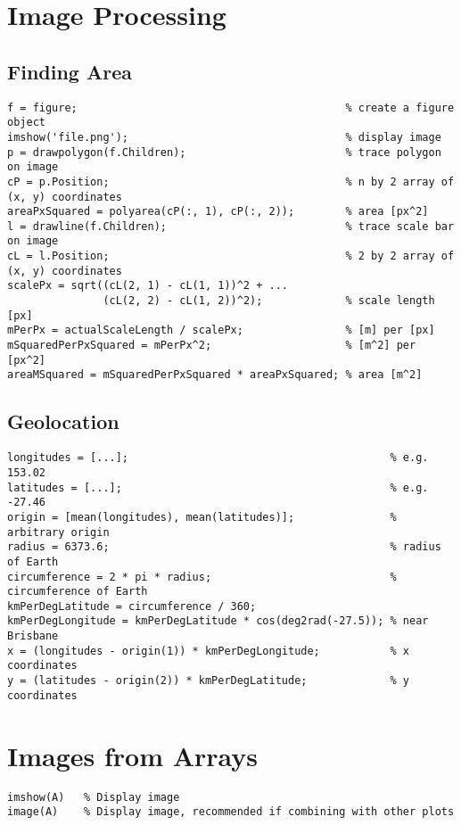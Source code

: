 \documentclass{article}
\begin{document}
\section*{Image Processing}
\subsection*{Finding Area}
\begin{lstlisting}
f = figure;                                          % create a figure object
imshow('file.png');                                  % display image 
p = drawpolygon(f.Children);                         % trace polygon on image
cP = p.Position;                                     % n by 2 array of (x, y) coordinates
areaPxSquared = polyarea(cP(:, 1), cP(:, 2));        % area [px^2]
l = drawline(f.Children);                            % trace scale bar on image
cL = l.Position;                                     % 2 by 2 array of (x, y) coordinates
scalePx = sqrt((cL(2, 1) - cL(1, 1))^2 + ...
               (cL(2, 2) - cL(1, 2))^2);             % scale length [px]
mPerPx = actualScaleLength / scalePx;                % [m] per [px]
mSquaredPerPxSquared = mPerPx^2;                     % [m^2] per [px^2]
areaMSquared = mSquaredPerPxSquared * areaPxSquared; % area [m^2]
\end{lstlisting}
\subsection*{Geolocation}
\begin{lstlisting}
longitudes = [...];                                         % e.g. 153.02
latitudes = [...];                                          % e.g. -27.46
origin = [mean(longitudes), mean(latitudes)];               % arbitrary origin
radius = 6373.6;                                            % radius of Earth
circumference = 2 * pi * radius;                            % circumference of Earth
kmPerDegLatitude = circumference / 360;
kmPerDegLongitude = kmPerDegLatitude * cos(deg2rad(-27.5)); % near Brisbane
x = (longitudes - origin(1)) * kmPerDegLongitude;           % x coordinates
y = (latitudes - origin(2)) * kmPerDegLatitude;             % y coordinates
\end{lstlisting}
\section*{Images from Arrays}
\begin{lstlisting}
imshow(A)   % Display image
image(A)    % Display image, recommended if combining with other plots
\end{lstlisting}
\end{document}
